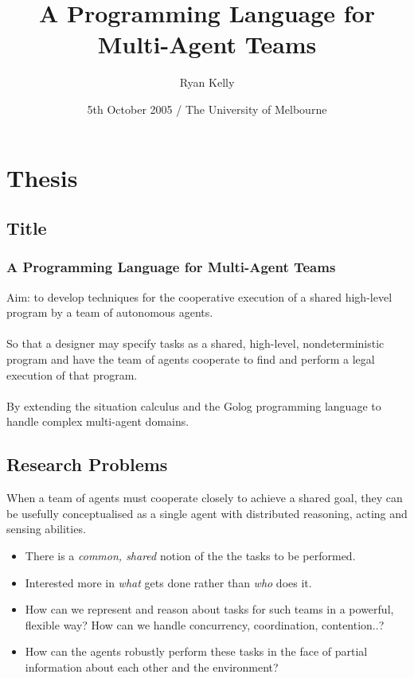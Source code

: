 \documentclass[compress]{beamer}
\title
{A Programming Language for\\Multi-Agent Teams}
\author
{Ryan Kelly}
\institute[The University of Melbourne]
{
  Department of Computer Science and Software Engineering\\
  The University of Melbourne%
}
\date[The University of Melbourne]
{5th October 2005 / The University of Melbourne}
\begin{document}
\begin{frame}
  \titlepage
\end{frame}

\section{Thesis}

\subsection{Title}

\begin{frame}
\frametitle{A Programming Language for Multi-Agent Teams}
Aim: to develop techniques for the cooperative execution of
a shared high-level program by a team of autonomous agents.
\\\ 
\\
\pause
So that a designer may
specify tasks as a shared, high-level, nondeterministic program and
have the team of agents cooperate to find and perform a legal execution of that
program.
\\\ 
\\
\pause
By extending the
situation calculus and the Golog programming language to handle complex
multi-agent domains.
\end{frame}

\subsection{Research Problems}
\begin{frame}
When a team of agents must cooperate closely to achieve a shared goal,
they can be usefully conceptualised as a single agent with distributed
reasoning, acting and sensing abilities.
\begin{itemize}
\item<2-> There is a \emph{common, shared} notion of the the tasks to be
performed.
\item<3-> Interested more in \emph{what} gets done rather than
\emph{who} does it.
\item<4-> How can we represent and reason about tasks for such teams in
a powerful, flexible way?  How can we handle concurrency, coordination,
contention..?
\item<5-> How can the agents robustly perform these tasks in the face of
partial information about each other and the environment?
\end{itemize}
\end{frame}
\end{document}
